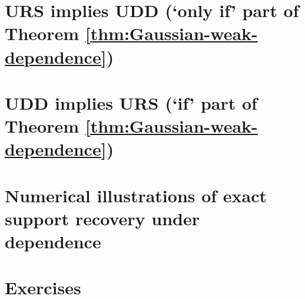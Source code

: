 \section{URS implies UDD (`only if' part of Theorem \ref{thm:Gaussian-weak-dependence})} 
\label{sec:URS=>UDD}


\section{UDD implies URS (`if' part of Theorem \ref{thm:Gaussian-weak-dependence})} 
\label{sec:UDD=>URS}


\section{Numerical illustrations of exact support recovery under dependence}
\label{sec:URS-numerical}



\section{Exercises}
\label{sec:Exercises-URS}

